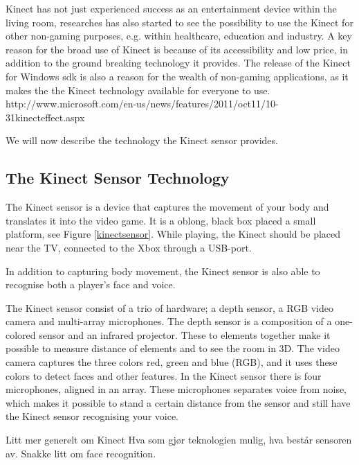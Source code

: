 Kinect has not just experienced success as an entertainment device within the living room, researches has also started to see the possibility to use the Kinect for other non-gaming purposes, e.g. within healthcare, education and industry. A key reason for the broad use of Kinect is because of its accessibility and low price, in addition to the ground breaking technology it provides. The release of the Kinect for Windows \ac{sdk} is also a reason for the wealth of non-gaming applications, as it makes the the Kinect technology available for everyone to use. http://www.microsoft.com/en-us/news/features/2011/oct11/10-31kinecteffect.aspx

We will now describe the technology the Kinect sensor provides.     

\subsection{The Kinect Sensor Technology}
The Kinect sensor is a device that captures the movement of your body and translates it into the video game. It is a oblong, black box placed a small platform, see Figure \ref{kinectsensor}. While playing, the Kinect should be placed near the TV, connected to the Xbox through a USB-port.   

In addition to capturing body movement, the Kinect sensor is also able to recognise both a player's face and voice.

The Kinect sensor consist of a trio of hardware; a depth sensor, a RGB video camera and multi-array microphones. The depth sensor is a composition of a one-colored sensor and an infrared projector. These to elements together make it possible to measure distance of elements and to see the room in 3D. The video camera captures the three colors red, green and blue (RGB), and it uses these colors to detect faces and other features. In the Kinect sensor there is four microphones, aligned in an array. These microphones separates voice from noise, which makes it possible to stand a certain distance from the sensor and still have the Kinect sensor recognising your voice.          

Litt mer generelt om Kinect
Hva som gjør teknologien mulig, hva består sensoren av.
Snakke litt om face recognition. 